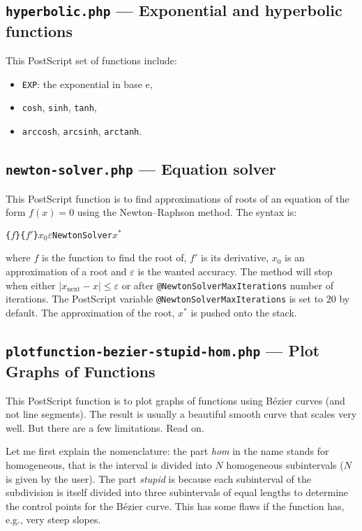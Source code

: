 \documentclass[10pt,a4paper]{scrartcl}
\newcommand\code[1]{\lstinline{#1}}
\newcommand\PS{PostScript}
\begin{document}
\subsection{\texttt{hyperbolic.php} --- Exponential and hyperbolic functions }
\label{ssec:hyperbolic.php}
This \PS{} set of functions include:
\begin{itemize}
\item \code{EXP}: the exponential in base $\mathrm{e}$,
\item \code{cosh}, \code{sinh}, \code{tanh},
\item \code{arccosh}, \code{arcsinh}, \code{arctanh}.
\end{itemize}

\subsection{\texttt{newton-solver.php} --- Equation solver}
\label{ssec:newton-solver.php}
This \PS{} function is to find approximations of roots of an equation
of the form $f(x)=0$ using the Newton--Raphson method. The syntax is:
\begin{center}
\texttt{\{}$f$\texttt{\}}\quad\texttt{\{}$f'$\texttt{\}}\quad$x_0$\quad$\varepsilon$\quad\texttt{NewtonSolver}\quad$x^*$
\end{center}
where $f$ is the function to find the root of, $f'$ is its derivative, $x_0$ is an approximation of a root
and $\varepsilon$ is the wanted accuracy. The method will stop when either $\lvert x_{\text{next}}-x\rvert\leq\varepsilon$
or after \verb=@NewtonSolverMaxIterations= number of iterations. The \PS{} variable \verb=@NewtonSolverMaxIterations=
is set to $20$ by default. The approximation of the root, $x^*$ is pushed onto the stack.

\subsection{\texttt{plotfunction-bezier-stupid-hom.php} --- Plot Graphs of Functions}
\label{ssec:plotfunction-bezier-stupid-hom.php}
This \PS{} function is to plot graphs of functions using B\'ezier curves (and not
line segments). The result is usually a beautiful smooth curve that scales very
well. But there are a few limitations. Read on.

Let me first explain the nomenclature: the part \emph{hom} in the name stands
for homogeneous, that is the interval is divided into $N$ homogeneous
subintervals ($N$ is given by the user). The part \emph{stupid} is because each subinterval
of the subdivision is itself divided into three subintervals of equal lengths to determine
the control points for the B\'ezier curve. This has some flaws if the function has, e.g.,
very steep slopes.
\end{document}

